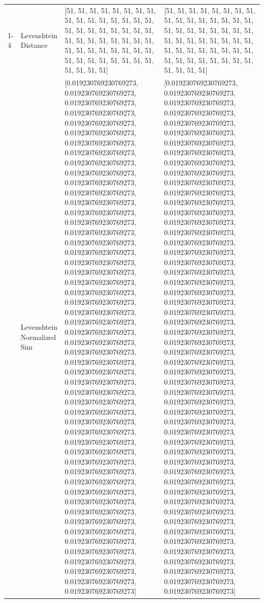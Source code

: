 \begin{tabular}{llll}
\cline{1-4}
\multirow[t]{4}{*}{Omwana otatara nigo orengereria ng'ina noyokomanyia.} & Levenshtein Distance & [51, 51, 51, 51, 51, 51, 51, 51, 51, 51, 51, 51, 51, 51, 51, 51, 51, 51, 51, 51, 51, 51, 51, 51, 51, 51, 51, 51, 51, 51, 51, 51, 51, 51, 51, 51, 51, 51, 51, 51, 51, 51, 51, 51, 51, 51, 51, 51, 51, 51, 51, 51] & [51, 51, 51, 51, 51, 51, 51, 51, 51, 51, 51, 51, 51, 51, 51, 51, 51, 51, 51, 51, 51, 51, 51, 51, 51, 51, 51, 51, 51, 51, 51, 51, 51, 51, 51, 51, 51, 51, 51, 51, 51, 51, 51, 51, 51, 51, 51, 51, 51, 51, 51, 51] \\
 & Levenshtein Normalized Sim & [0.019230769230769273, 0.019230769230769273, 0.019230769230769273, 0.019230769230769273, 0.019230769230769273, 0.019230769230769273, 0.019230769230769273, 0.019230769230769273, 0.019230769230769273, 0.019230769230769273, 0.019230769230769273, 0.019230769230769273, 0.019230769230769273, 0.019230769230769273, 0.019230769230769273, 0.019230769230769273, 0.019230769230769273, 0.019230769230769273, 0.019230769230769273, 0.019230769230769273, 0.019230769230769273, 0.019230769230769273, 0.019230769230769273, 0.019230769230769273, 0.019230769230769273, 0.019230769230769273, 0.019230769230769273, 0.019230769230769273, 0.019230769230769273, 0.019230769230769273, 0.019230769230769273, 0.019230769230769273, 0.019230769230769273, 0.019230769230769273, 0.019230769230769273, 0.019230769230769273, 0.019230769230769273, 0.019230769230769273, 0.019230769230769273, 0.019230769230769273, 0.019230769230769273, 0.019230769230769273, 0.019230769230769273, 0.019230769230769273, 0.019230769230769273, 0.019230769230769273, 0.019230769230769273, 0.019230769230769273, 0.019230769230769273, 0.019230769230769273, 0.019230769230769273, 0.019230769230769273] & [0.019230769230769273, 0.019230769230769273, 0.019230769230769273, 0.019230769230769273, 0.019230769230769273, 0.019230769230769273, 0.019230769230769273, 0.019230769230769273, 0.019230769230769273, 0.019230769230769273, 0.019230769230769273, 0.019230769230769273, 0.019230769230769273, 0.019230769230769273, 0.019230769230769273, 0.019230769230769273, 0.019230769230769273, 0.019230769230769273, 0.019230769230769273, 0.019230769230769273, 0.019230769230769273, 0.019230769230769273, 0.019230769230769273, 0.019230769230769273, 0.019230769230769273, 0.019230769230769273, 0.019230769230769273, 0.019230769230769273, 0.019230769230769273, 0.019230769230769273, 0.019230769230769273, 0.019230769230769273, 0.019230769230769273, 0.019230769230769273, 0.019230769230769273, 0.019230769230769273, 0.019230769230769273, 0.019230769230769273, 0.019230769230769273, 0.019230769230769273, 0.019230769230769273, 0.019230769230769273, 0.019230769230769273, 0.019230769230769273, 0.019230769230769273, 0.019230769230769273, 0.019230769230769273, 0.019230769230769273, 0.019230769230769273, 0.019230769230769273, 0.019230769230769273, 0.019230769230769273] \\

\end{tabular}
